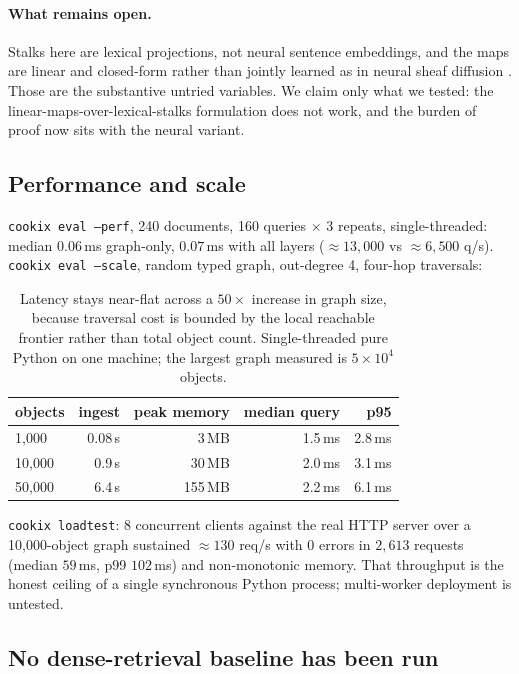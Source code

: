 \documentclass[11pt]{article}
\theoremstyle{definition}
\newcommand{\cmd}[1]{\texttt{\small #1}}
\begin{document}
\paragraph{What remains open.} Stalks here are lexical projections, not neural sentence
embeddings, and the maps are linear and closed-form rather than jointly learned as in
neural sheaf diffusion \cite{bodnar2022neural}. Those are the substantive untried
variables. We claim only what we tested: the linear-maps-over-lexical-stalks formulation
does not work, and the burden of proof now sits with the neural variant.

\subsection{Performance and scale}

\cmd{cookix eval --perf}, 240 documents, 160 queries $\times$ 3 repeats,
single-threaded: median $0.06$\,ms graph-only, $0.07$\,ms with all layers
($\approx13{,}000$ vs $\approx6{,}500$ q/s). \cmd{cookix eval --scale}, random typed
graph, out-degree 4, four-hop traversals:

\begin{table}[h]
\centering
\begin{tabular}{lrrrr}
\toprule
objects & ingest & peak memory & median query & p95 \\
\midrule
1{,}000  & 0.08\,s & 3\,MB   & 1.5\,ms & 2.8\,ms \\
10{,}000 & 0.9\,s  & 30\,MB  & 2.0\,ms & 3.1\,ms \\
50{,}000 & 6.4\,s  & 155\,MB & 2.2\,ms & 6.1\,ms \\
\bottomrule
\end{tabular}
\caption{Latency stays near-flat across a $50\times$ increase in graph size, because
traversal cost is bounded by the local reachable frontier rather than total object
count. Single-threaded pure Python on one machine; the largest graph measured is
$5\times10^4$ objects.}
\end{table}

\cmd{cookix loadtest}: 8 concurrent clients against the real HTTP server over a
10{,}000-object graph sustained $\approx130$ req/s with $0$ errors in $2{,}613$ requests
(median $59$\,ms, p99 $102$\,ms) and non-monotonic memory. That throughput is the honest
ceiling of a single synchronous Python process; multi-worker deployment is untested.

\subsection{No dense-retrieval baseline has been run}
\label{sec:no-vector-baseline}
\end{document}
